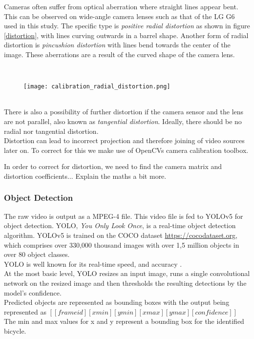 Cameras often suffer from optical aberration where straight lines appear bent. This can be observed on wide-angle camera lenses such as that of the LG G6 used in this study.
The specific type is \textit{positive radial distortion} as shown in figure \ref{distortion}, with lines curving outwards in a barrel shape.
Another form of radial distortion is \textit{pincushion distortion} with lines bend towards the center of the image. These aberrations are a result 
of the curved shape of the camera lens.

\ \\ 
\begin{figure}[h]
  \texttt{[image: calibration\_radial\_distortion.png]}
  \centering 
  \end{figure}
  \label{distortion}

\ \\

There is also a possibility of further distortion if the camera sensor and the lens are not parallel, also known as \textit{tangential distortion}.
Ideally, there should be no radial nor tangential distortion.
\ \\
Distortion can lead to incorrect projection and therefore joining of video sources later on.
To correct for this we make use of OpenCVs \cite{noauthor_opencv/opencv_2021} camera calibration toolbox.

\color{red}
In order to correct for distortion, we need to find the camera matrix and distortion coefficients... Explain the maths a bit more.
\color{black}
\ \\
\subsubsection{Object Detection}

The raw video is output as a MPEG-4 file. This video file is fed to YOLOv5 for object detection. YOLO, \textit{You Only Look Once},
is a real-time object detection algorithm. YOLOv5 is trained on the COCO dataset \url{https://cocodataset.org}, which comprises over 330,000 thousand images
with over 1,5 million objects in over 80 object classes.
\ \\ 
YOLO is well known for its real-time speed, and accuracy \cite{redmon2016look}.
\ \\ 
At the most basic level, YOLO resizes an input image, runs a single convolutional network on the resized image
and then thresholds the resulting detections by the model’s confidence.
\ \\ 
Predicted objects are represented as bounding boxes with the output being represented as $[[frame id][xmin][ymin][xmax][ymax][confidence]]$
\ \\
The min and max values for x and y represent a bounding box for the identified bicycle.


